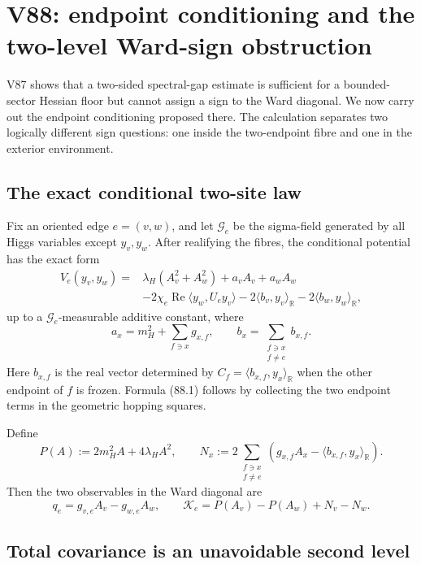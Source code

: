 \documentclass[11pt]{article}
\theoremstyle{remark}
\begin{document}
\section{V88: endpoint conditioning and the two-level Ward-sign obstruction}
\label{sec:v17v88}

V87 shows that a two-sided spectral-gap estimate is sufficient for a
bounded-sector Hessian floor but cannot assign a sign to the Ward
diagonal.  We now carry out the endpoint conditioning proposed there.
The calculation separates two logically different sign questions: one
inside the two-endpoint fibre and one in the exterior environment.

\subsection{The exact conditional two-site law}

Fix an oriented edge \(e=(v,w)\), and let \(\mathscr G_e\) be the
sigma-field generated by all Higgs variables except \(y_v,y_w\).  After
realifying the fibres, the conditional potential has the exact form
\[
\begin{aligned}
 V_e(y_v,y_w)={}&
 \lambda_H(A_v^2+A_w^2)+a_vA_v+a_wA_w\\
 &-2\chi_e\operatorname{Re}\langle y_w,U_ey_v\rangle
 -2\langle b_v,y_v\rangle_{\mathbb R}
 -2\langle b_w,y_w\rangle_{\mathbb R},              \tag{88.1}
\end{aligned}
\]
up to a \(\mathscr G_e\)-measurable additive constant, where
\[
 a_x=m_H^2+\sum_{f\ni x}g_{x,f},
 \qquad
 b_x=\sum_{\substack{f\ni x\\f\ne e}}b_{x,f}.       \tag{88.2}
\]
Here \(b_{x,f}\) is the real vector determined by
\(C_f=\langle b_{x,f},y_x\rangle_{\mathbb R}\) when the other endpoint
of \(f\) is frozen.  Formula (88.1) follows by collecting the two
endpoint terms in the geometric hopping squares.

Define
\[
 P(A):=2m_H^2A+4\lambda_HA^2,
 \qquad
 N_x:=2\sum_{\substack{f\ni x\\f\ne e}}
       (g_{x,f}A_x-\langle b_{x,f},y_x\rangle_{\mathbb R}).           \tag{88.3}
\]
Then the two observables in the Ward diagonal are
\[
 q_e=g_{v,e}A_v-g_{w,e}A_w,
 \qquad
 \mathcal K_e=P(A_v)-P(A_w)+N_v-N_w.                \tag{88.4}
\]

\subsection{Total covariance is an unavoidable second level}
\end{document}

